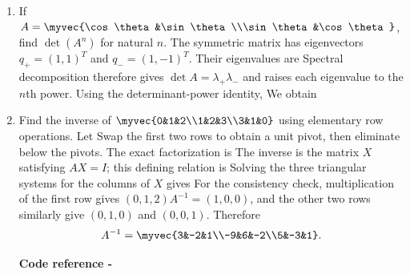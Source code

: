 \begin{enumerate}[label=\thesection.\arabic{subsection}.\arabic{enumi},ref=\arabic{enumi},leftmargin=4mm,itemsep=9pt]
\paragraph*{Matrices and determinants}
\item \label{question:C12-Q28}\label{question-short:C12-Q28} If $A=\myvec{\cos\theta&\sin\theta\\\sin\theta&\cos\theta}$, find $\det(A^n)$ for natural $n$.
\engsolution
The symmetric matrix has eigenvectors $q_+=(1,1)^T$ and $q_-=(1,-1)^T$. Their eigenvalues are
Spectral decomposition therefore gives $\det A=\lambda_+\lambda_-$ and raises each eigenvalue to the $n$th power. Using the determinant-power identity,
We obtain

\item \label{question:C12-Q30}\label{question-short:C12-Q30} Find the inverse of $\myvec{0&1&2\\1&2&3\\3&1&0}$ using elementary row operations.
\engsolution
Let
Swap the first two rows to obtain a unit pivot, then eliminate below the pivots. The exact factorization is
The inverse is the matrix $X$ satisfying $AX=I$; this defining relation is
Solving the three triangular systems for the columns of $X$ gives
For the consistency check, multiplication of the first row gives $(0,1,2)A^{-1}=(1,0,0)$, and the other two rows similarly give $(0,1,0)$ and $(0,0,1)$. Therefore
\[
A^{-1}=\myvec{3&-2&1\\-9&6&-2\\5&-3&1}.
\]
\par\smallskip\noindent\textbf{Code reference -}\par\noindent{}


\end{enumerate}
